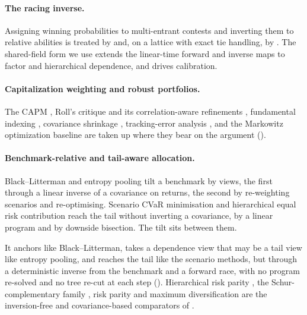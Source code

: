 \paragraph{The racing inverse.}
Assigning winning probabilities to multi-entrant contests and inverting them to
relative abilities is treated by \textcite{harville1973} and, on a lattice with
exact tie handling, by \textcite{cotton2021}. The shared-field form we use
\parencite{cotton2026inversion} extends the linear-time forward and inverse maps to
factor and hierarchical dependence, and drives calibration.

\paragraph{Capitalization weighting and robust portfolios.}
The CAPM \parencite{sharpe1964}, Roll's critique \parencite{roll1977} and its
correlation-aware refinements \parencite{prono2009}, fundamental indexing
\parencite{hsu2006}, covariance shrinkage \parencite{ledoitwolf2004},
tracking-error analysis \parencite{roll1992}, and the Markowitz optimization
baseline \parencite{markowitz1952} are taken up where they bear on the argument
().

\paragraph{Benchmark-relative and tail-aware allocation.}
Black--Litterman \parencite{black1992} and entropy pooling \parencite{meucci2008}
tilt a benchmark by views, the first through a linear inverse of a covariance on
returns, the second by re-weighting scenarios and re-optimising.
Scenario CVaR
minimisation \parencite{rockafellar2000} and hierarchical equal risk contribution
\parencite{raffinot2018} reach the tail without inverting a covariance, by a
linear program and by downside bisection.
The tilt sits between them.

It anchors
like Black--Litterman, takes a dependence view that may be a tail view like
entropy pooling, and reaches the tail like the scenario methods, but through a
deterministic inverse from the benchmark and a forward race, with no program
re-solved and no tree re-cut at each step ().
Hierarchical risk parity \parencite{lopezdeprado2016}, the Schur-complementary
family \parencite{cotton2024schur}, risk parity \parencite{maillard2010} and
maximum diversification \parencite{choueifaty2008} are the inversion-free and
covariance-based comparators of .


